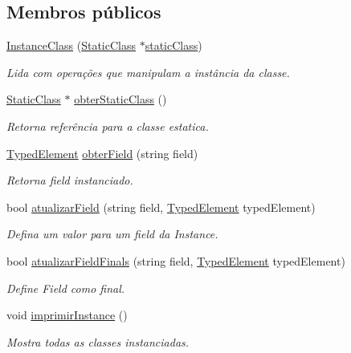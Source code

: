 \subsection*{Membros públicos}
\begin{DoxyCompactItemize}
\item 
\hyperlink{classInstanceClass_ac1bee1eb9725e1fec8de7f4cf97f369c}{Instance\+Class} (\hyperlink{classStaticClass}{Static\+Class} $\ast$\hyperlink{classInstanceClass_a45804f1afe3666a4b4511cf8e3f1013b}{static\+Class})
\begin{DoxyCompactList}\small\item\em Lida com operações que manipulam a instância da classe. \end{DoxyCompactList}\item 
\hyperlink{classStaticClass}{Static\+Class} $\ast$ \hyperlink{classInstanceClass_a6da567a64a8373d609792821f5acb9a3}{obter\+Static\+Class} ()
\begin{DoxyCompactList}\small\item\em Retorna referência para a classe estatica. \end{DoxyCompactList}\item 
\hyperlink{BasicTypes_8h_a97b332303b1262282599e6ede0637b82}{Typed\+Element} \hyperlink{classInstanceClass_a98084eb37c43d680169298bc50f09c98}{obter\+Field} (string field)
\begin{DoxyCompactList}\small\item\em Retorna field instanciado. \end{DoxyCompactList}\item 
bool \hyperlink{classInstanceClass_a3af2fc7bfe8f406b5ea6efbf18161514}{atualizar\+Field} (string field, \hyperlink{BasicTypes_8h_a97b332303b1262282599e6ede0637b82}{Typed\+Element} typed\+Element)
\begin{DoxyCompactList}\small\item\em Defina um valor para um field da Instance. \end{DoxyCompactList}\item 
bool \hyperlink{classInstanceClass_a05a47d4bf656908ce3dacc53d9d791b2}{atualizar\+Field\+Finals} (string field, \hyperlink{BasicTypes_8h_a97b332303b1262282599e6ede0637b82}{Typed\+Element} typed\+Element)
\begin{DoxyCompactList}\small\item\em Define Field como final. \end{DoxyCompactList}\item 
void \hyperlink{classInstanceClass_a9790b6bb982d58a0bbddcb8c9ba358d4}{imprimir\+Instance} ()
\begin{DoxyCompactList}\small\item\em Mostra todas as classes instanciadas. \end{DoxyCompactList}\end{DoxyCompactItemize}
